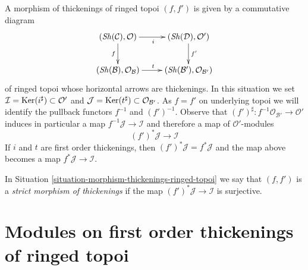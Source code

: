 \begin{situation}
\label{situation-morphism-thickenings-ringed-topoi}
A morphism of thickenings of ringed topoi $(f, f')$
is given by a commutative diagram
\begin{equation}
\label{equation-morphism-thickenings-ringed-topoi}
\vcenter{
\xymatrix{
(\Sh(\mathcal{C}), \mathcal{O}) \ar[r]_i \ar[d]_f &
(\Sh(\mathcal{D}), \mathcal{O}') \ar[d]^{f'} \\
(\Sh(\mathcal{B}), \mathcal{O}_\mathcal{B}) \ar[r]^t &
(\Sh(\mathcal{B}'), \mathcal{O}_{\mathcal{B}'})
}
}
\end{equation}
of ringed topoi whose horizontal arrows are thickenings. In this
situation we set
$\mathcal{I} = \mathop{\mathrm{Ker}}(i^\sharp) \subset \mathcal{O}'$ and
$\mathcal{J} = \mathop{\mathrm{Ker}}(t^\sharp) \subset \mathcal{O}_{\mathcal{B}'}$.
As $f = f'$ on underlying topoi we will identify
the pullback functors $f^{-1}$ and $(f')^{-1}$.
Observe that
$(f')^\sharp : f^{-1}\mathcal{O}_{\mathcal{B}'} \to \mathcal{O}'$
induces in particular a map $f^{-1}\mathcal{J} \to \mathcal{I}$
and therefore a map of $\mathcal{O}'$-modules
$$
(f')^*\mathcal{J} \longrightarrow \mathcal{I}
$$
If $i$ and $t$ are first order thickenings, then
$(f')^*\mathcal{J} = f^*\mathcal{J}$ and the map above becomes a
map $f^*\mathcal{J} \to \mathcal{I}$.
\end{situation}

\begin{definition}
\label{definition-strict-morphism-thickenings-ringed-topoi}
In Situation \ref{situation-morphism-thickenings-ringed-topoi}
we say that $(f, f')$ is a {\it strict morphism of thickenings}
if the map $(f')^*\mathcal{J} \longrightarrow \mathcal{I}$ is surjective.
\end{definition}








\section{Modules on first order thickenings of ringed topoi}
\label{section-modules-thickenings-ringed-topoi}

